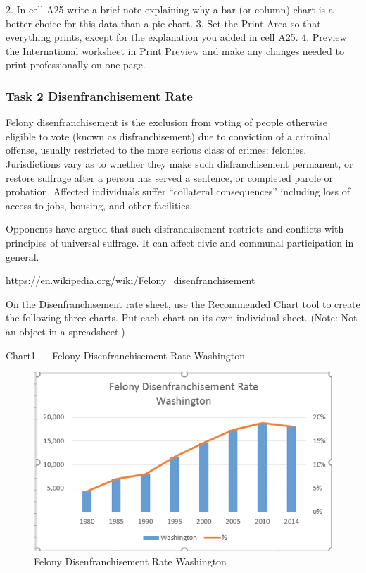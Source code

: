 2. In cell A25 write a brief note explaining why a bar (or column) chart is a better choice for this
data than a pie chart.
3. Set the Print Area so that everything prints, except for the explanation you added in cell A25.
4. Preview the International worksheet in Print Preview and make any changes needed to print
professionally on one page.

\subsubsection{Task 2 Disenfranchisement Rate}

Felony disenfranchisement is the exclusion from voting of people otherwise eligible to vote (known
as disfranchisement) due to conviction of a criminal offense, usually restricted to the more serious
class of crimes: felonies. Jurisdictions vary as to whether they make such disfranchisement permanent,
or restore suffrage after a person has served a sentence, or completed parole or probation. Affected
individuals suffer “collateral consequences” including loss of access to jobs, housing, and other
facilities.

Opponents have argued that such disfranchisement restricts and conflicts with principles of universal
suffrage. It can affect civic and communal participation in general.

\url{https://en.wikipedia.org/wiki/Felony_disenfranchisement}

On the Disenfranchisement rate sheet, use the Recommended Chart tool to create the following three
charts. Put each chart on its own individual sheet. (Note: Not an object in a spreadsheet.)

Chart1 — Felony Disenfranchisement Rate Washington


\begin{figure}[H]
	\centering
	\includegraphics[width=\maxwidth{.95\linewidth}]{gfx/ch04_fig54}
	\caption{Felony Disenfranchisement Rate Washington}
	\label{04:fig54}
\end{figure}







